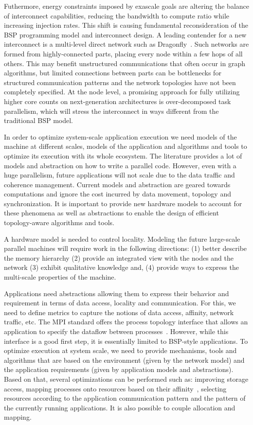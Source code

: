 Futhermore, energy constraints imposed by exascale goals are altering
the balance of interconnect capabilities, reducing the bandwidth to
compute ratio while increasing injection rates.  This shift is causing
fundamental reconsideration of the BSP programming model and
interconnect design.  A leading contender for a new interconnect is a
multi-level direct network such as
Dragonfly~\cite{4556717,ibm-percs-network}.  Such networks are formed
from highly-connected parts, placing every node within a few hops of all
others.  This may benefit unstructured communications that often occur
in graph
algorithms, but limited connections between parts can be bottlenecks for
structured communication patterns and the network topologies have not been 
completely specified.  
At the node level, a promising approach for fully utilizing
higher core counts on next-generation architectures is over-decomposed
task parallelism, which will stress the interconnect in ways different
from the traditional BSP model.


In order to optimize system-scale application execution we need models
of the machine at different scales, models of the application and algorithms
and tools to optimize its execution with its whole ecosystem. 
The literature provides a lot of models and abstraction on how to write a
parallel code. However, even with a huge parallelism, future applications will
not scale due to the data traffic and coherence management. Current models and
abstraction are geared towards computations and ignore the cost incurred by data
movement, topology and synchronization.  It is important to provide new hardware
models to account for these phenomena as well as abstractions to enable the
design of efficient topology-aware algorithms and tools. 

A hardware model is needed to control locality.  Modeling the future large-scale
parallel machines will require work in the following directions: (1) better
describe the memory hierarchy (2) provide an integrated view with the nodes and
the network (3) exhibit qualitative knowledge and, (4) provide ways to express
the multi-scale properties of the machine.

Applications need abstractions allowing them to express their behavior
and requirement in terms of data access, locality and communication.
For this, we need to define metrics to capture the notions of data
access, affinity, network traffic, etc. The MPI standard offers the
process topology interface that allows an application to specify the
dataflow between processes~\cite{hoefler-mpi-2.2-scal-topo}. However,
while this interface is a good first step, it is essentially limited to
BSP-style applications.
%
To optimize execution at system scale, we need to provide mechanisms,
tools and algorithms that are based on the environment (given by the
network model) and the application requirements (given by application
models and abstractions). Based on that, several optimizations can be
performed such as: improving storage access, mapping processes onto
resources based on their
affinity~\cite{hjm14,DBLP:conf/ics/HoeflerS11,Navauxandal2009},
selecting resources according to the application communication pattern
and the pattern of the currently running applications. It is also
possible to couple allocation and mapping.


